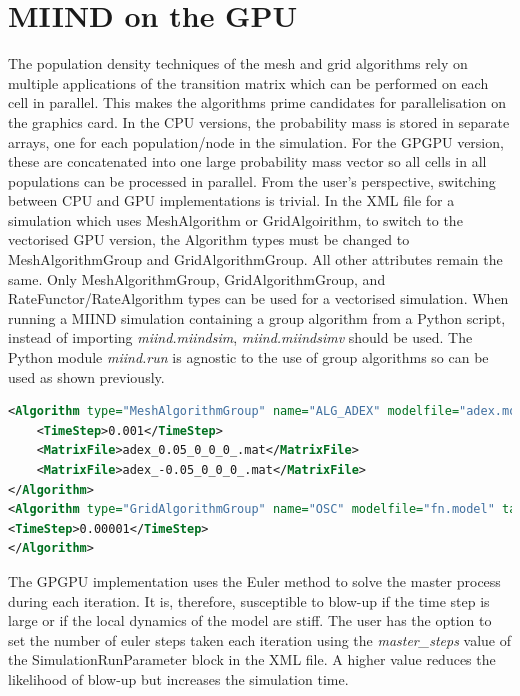 \documentclass[utf8]{frontiersSCNS} %
\begin{document}
\section{MIIND on the GPU}
\label{mainmiindgpu}
The population density techniques of the mesh and grid algorithms rely on multiple applications of the transition matrix which can be performed on each cell in parallel. This makes the algorithms prime candidates for parallelisation on the graphics card. In the CPU versions, the probability mass is stored in separate arrays, one for each population/node in the simulation. For the GPGPU version, these are concatenated into one large probability mass vector so all cells in all populations can be processed in parallel. From the user’s perspective, switching between CPU and GPU implementations is trivial. In the XML file for a simulation which uses MeshAlgorithm or GridAlgoirithm, to switch to the vectorised GPU version, the Algorithm types must be changed to MeshAlgorithmGroup and GridAlgorithmGroup. All other attributes remain the same. Only MeshAlgorithmGroup, GridAlgorithmGroup, and RateFunctor/RateAlgorithm types can be used for a vectorised simulation. When running a MIIND simulation containing a group algorithm from a Python script, instead of importing \textit{miind.miindsim}, \textit{miind.miindsimv} should be used. The Python module \textit{miind.run} is agnostic to the use of group algorithms so can be used as shown previously.

\begin{lstlisting}[language=xml,caption={A MeshAlgorithmGroup definition is identical to a MeshAlgorithm definition except for the type.}]
<Algorithm type="MeshAlgorithmGroup" name="ALG_ADEX" modelfile="adex.model" >
	<TimeStep>0.001</TimeStep>
	<MatrixFile>adex_0.05_0_0_0_.mat</MatrixFile>
	<MatrixFile>adex_-0.05_0_0_0_.mat</MatrixFile>
</Algorithm>
<Algorithm type="GridAlgorithmGroup" name="OSC" modelfile="fn.model" tau_refractive="0.0" transformfile="fn_0_0_0_0_.tmat" start_v="-1.0" start_w="-0.3" ratemethod="AvgV">
<TimeStep>0.00001</TimeStep>
</Algorithm>
\end{lstlisting}

The GPGPU implementation uses the Euler method to solve the master process during each iteration. It is, therefore, susceptible to blow-up if the time step is large or if the local dynamics of the model are stiff. The user has the option to set the number of euler steps taken each iteration using the \textit{master\_steps} value of the SimulationRunParameter block in the XML file. A higher value reduces the likelihood of blow-up but increases the simulation time. 
 
\end{document}
